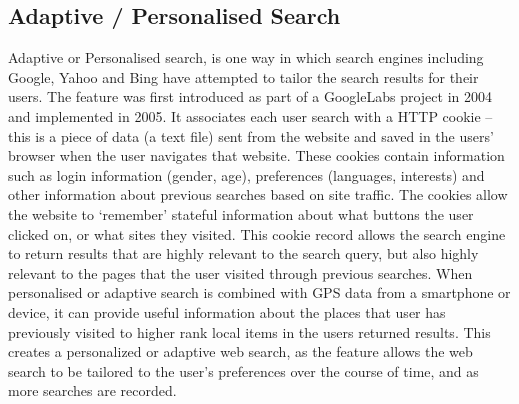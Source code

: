 \documentclass[10pt]{article}
\begin{document}
\subsection{Adaptive / Personalised Search}
Adaptive or Personalised search, is one way in which search engines including Google, Yahoo and Bing have attempted to tailor the search results for their users. The feature was first introduced as part of a GoogleLabs project in 2004 and implemented in 2005. It associates each user search with a HTTP cookie – this is a piece of data (a text file) sent from the website and saved in the users’ browser when the user navigates that website. These cookies contain information such as login information (gender, age), preferences (languages, interests) and other information about previous searches based on site traffic. The cookies allow the website to ‘remember’ stateful information about what buttons the user clicked on, or what sites they visited. This cookie record allows the search engine to return results that are highly relevant to the search query, but also highly relevant to the pages that the user visited through previous searches. When personalised or adaptive search is combined with GPS data from a smartphone or device, it can provide useful information about the places that user has previously visited to higher rank local items in the users returned results. This creates a personalized or adaptive web search, as the feature allows the web search to be tailored to the user’s preferences over the course of time, and as more searches are recorded.
\end{document}
